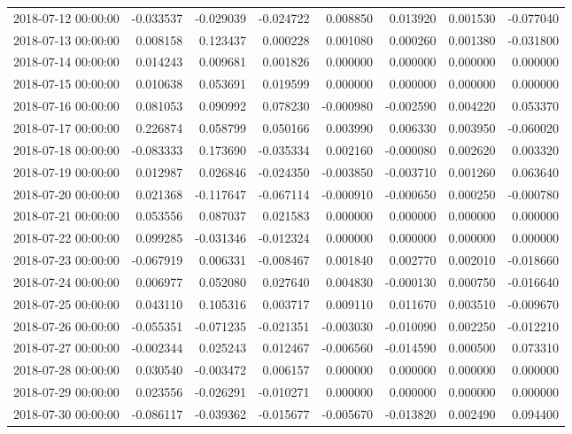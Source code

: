 \begin{tabular}{lrrrrrrr}
2018-07-12 00:00:00 & -0.033537 & -0.029039 & -0.024722 & 0.008850 & 0.013920 & 0.001530 & -0.077040 \\
2018-07-13 00:00:00 & 0.008158 & 0.123437 & 0.000228 & 0.001080 & 0.000260 & 0.001380 & -0.031800 \\
2018-07-14 00:00:00 & 0.014243 & 0.009681 & 0.001826 & 0.000000 & 0.000000 & 0.000000 & 0.000000 \\
2018-07-15 00:00:00 & 0.010638 & 0.053691 & 0.019599 & 0.000000 & 0.000000 & 0.000000 & 0.000000 \\
2018-07-16 00:00:00 & 0.081053 & 0.090992 & 0.078230 & -0.000980 & -0.002590 & 0.004220 & 0.053370 \\
2018-07-17 00:00:00 & 0.226874 & 0.058799 & 0.050166 & 0.003990 & 0.006330 & 0.003950 & -0.060020 \\
2018-07-18 00:00:00 & -0.083333 & 0.173690 & -0.035334 & 0.002160 & -0.000080 & 0.002620 & 0.003320 \\
2018-07-19 00:00:00 & 0.012987 & 0.026846 & -0.024350 & -0.003850 & -0.003710 & 0.001260 & 0.063640 \\
2018-07-20 00:00:00 & 0.021368 & -0.117647 & -0.067114 & -0.000910 & -0.000650 & 0.000250 & -0.000780 \\
2018-07-21 00:00:00 & 0.053556 & 0.087037 & 0.021583 & 0.000000 & 0.000000 & 0.000000 & 0.000000 \\
2018-07-22 00:00:00 & 0.099285 & -0.031346 & -0.012324 & 0.000000 & 0.000000 & 0.000000 & 0.000000 \\
2018-07-23 00:00:00 & -0.067919 & 0.006331 & -0.008467 & 0.001840 & 0.002770 & 0.002010 & -0.018660 \\
2018-07-24 00:00:00 & 0.006977 & 0.052080 & 0.027640 & 0.004830 & -0.000130 & 0.000750 & -0.016640 \\
2018-07-25 00:00:00 & 0.043110 & 0.105316 & 0.003717 & 0.009110 & 0.011670 & 0.003510 & -0.009670 \\
2018-07-26 00:00:00 & -0.055351 & -0.071235 & -0.021351 & -0.003030 & -0.010090 & 0.002250 & -0.012210 \\
2018-07-27 00:00:00 & -0.002344 & 0.025243 & 0.012467 & -0.006560 & -0.014590 & 0.000500 & 0.073310 \\
2018-07-28 00:00:00 & 0.030540 & -0.003472 & 0.006157 & 0.000000 & 0.000000 & 0.000000 & 0.000000 \\
2018-07-29 00:00:00 & 0.023556 & -0.026291 & -0.010271 & 0.000000 & 0.000000 & 0.000000 & 0.000000 \\
2018-07-30 00:00:00 & -0.086117 & -0.039362 & -0.015677 & -0.005670 & -0.013820 & 0.002490 & 0.094400 \\

\end{tabular}
